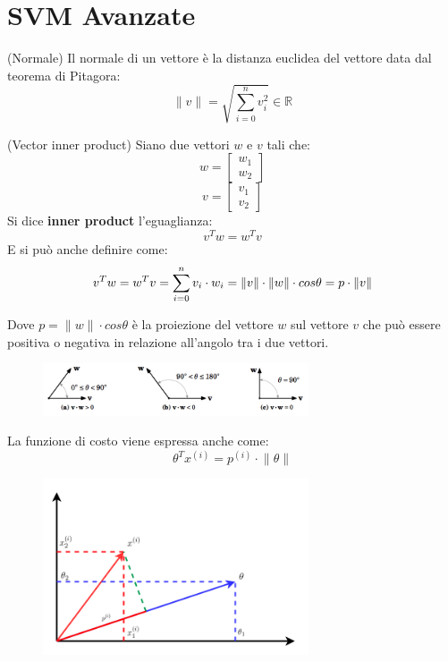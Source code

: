 \section{SVM Avanzate}
\begin{definizione}(Normale)
  Il normale di un vettore è la distanza euclidea del vettore data dal teorema di Pitagora:
  \[\lVert v\rVert = \sqrt{\sum_{i=0}^n v_i^2} \in \mathbb{R}\]
\end{definizione}
\begin{definizione}(Vector inner product)
  Siano due vettori $w$ e $v$ tali che:
    \[w = \begin{bmatrix}w_1 \\ w_2 \end{bmatrix}\]
    \[v = \begin{bmatrix}v_1 \\ v_2 \end{bmatrix}\]
    Si dice \textbf{inner product} l'eguaglianza:
    \[v^Tw = w^Tv\]
    E si può anche definire come:
\[v^Tw = w^Tv = \sum_{i=0}^n v_i \cdot w_i \\
    = \lVert v\rVert \cdot \lVert w\rVert \cdot cos \theta = p \cdot \lVert v\rVert
\]
\begin{nota}
Dove $p=\lVert w\rVert \cdot cos \theta$ è la proiezione del vettore $w$ sul vettore $v$ che può essere positiva o negativa in relazione all'angolo tra i due vettori.
\begin{figure}[H]
    \centering
    \includegraphics[width=0.7\textwidth]{img/fig-6-dot-product.jpg}
\end{figure}
\end{nota}
\end{definizione}
\begin{definizione}
  La funzione di costo viene espressa anche come:
  \[\theta^Tx^{(i)} = p^{(i)} \cdot \lVert \theta \rVert\]
  \begin{figure}[H]
    \centering
    \includegraphics[width=0.7\textwidth]{img/fig-7-dot-product-in-svm.png}
\end{figure}
\end{definizione}
